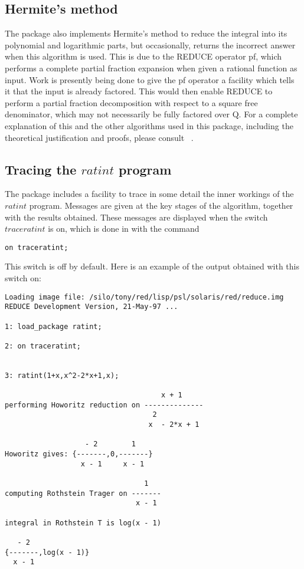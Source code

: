\subsection{Hermite's method}
The package also implements Hermite's method to reduce the integral into its polynomial and logarithmic parts, but occasionally, \REDUCE returns the incorrect answer when this algorithm is used. This is due to the REDUCE operator pf, which performs a complete partial fraction expansion when given a rational function as input. Work is presently being done to give the pf operator a facility which tells it that the input is already factored. This would then enable REDUCE to perform a partial fraction decomposition with respect to a square free denominator, which may not necessarily be fully factored over Q. 
\newline
For a complete explanation of this and the other algorithms used in this package, including the theoretical justification and proofs, please consult ~\cite{Ged92}.

\subsection{Tracing the $ratint$ program}
The package includes a facility to trace in some detail the inner workings of the $ratint$ program. Messages are given at the key stages of the algorithm, together with the results obtained. These messages are displayed when the switch $traceratint$ is on, which is done in \REDUCE with the command 
\begin{verbatim}
on traceratint;
\end{verbatim}
This switch is off by default. Here is an example of the output obtained with this switch on:

\begin{verbatim}
Loading image file: /silo/tony/red/lisp/psl/solaris/red/reduce.img
REDUCE Development Version, 21-May-97 ...

1: load_package ratint;

2: on traceratint;


3: ratint(1+x,x^2-2*x+1,x);

                                     x + 1
performing Howoritz reduction on --------------
                                   2
                                  x  - 2*x + 1

                   - 2        1
Howoritz gives: {-------,0,-------}
                  x - 1     x - 1

                                 1
computing Rothstein Trager on -------
                               x - 1

integral in Rothstein T is log(x - 1)

   - 2
{-------,log(x - 1)}
  x - 1

\end{verbatim}

